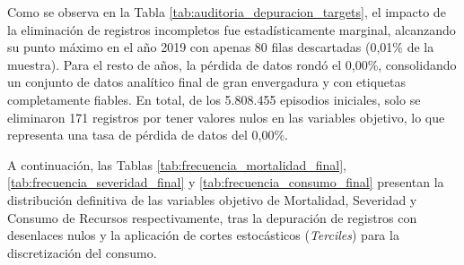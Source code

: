 Como se observa en la Tabla \ref{tab:auditoria_depuracion_targets}, el impacto de la eliminación de registros incompletos fue estadísticamente marginal, alcanzando su punto máximo en el año 2019 con apenas 80 filas descartadas (0,01\% de la muestra). Para el resto de años, la pérdida de datos rondó el 0,00\%, consolidando un conjunto de datos analítico final de gran envergadura y con etiquetas completamente fiables. En total, de los 5.808.455 episodios iniciales, solo se eliminaron 171 registros por tener valores nulos en las variables objetivo, lo que representa una tasa de pérdida de datos del 0,00\%.

A continuación, las Tablas \ref{tab:frecuencia_mortalidad_final}, \ref{tab:frecuencia_severidad_final} y \ref{tab:frecuencia_consumo_final} presentan la distribución definitiva de las variables objetivo de Mortalidad, Severidad y Consumo de Recursos respectivamente, tras la depuración de registros con desenlaces nulos y la aplicación de cortes estocásticos (\textit{Terciles}) para la discretización del consumo.

